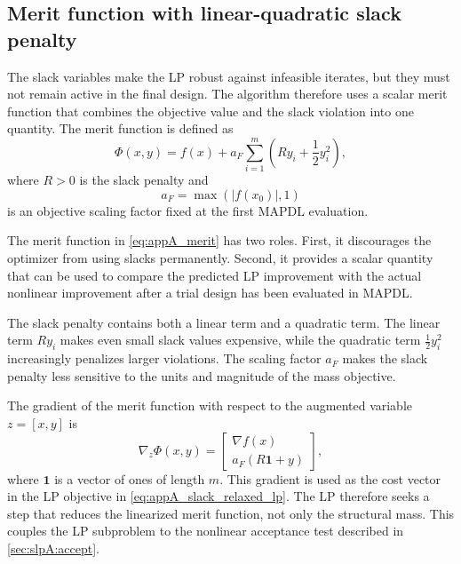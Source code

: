 \documentclass[11pt,a4paper]{article}
\begin{document}
\subsection{Merit function with linear-quadratic slack penalty}
\label{sec:slpA:merit}

The slack variables make the LP robust against infeasible iterates,
but they must not remain active in the final design. The algorithm
therefore uses a scalar merit function that combines the objective
value and the slack violation into one quantity. The merit function
is defined as
\begin{equation}
\label{eq:appA_merit}
    \Phi(x,y)
    =
    f(x)
    +
    a_F
    \sum_{i=1}^{m}
    \left(
        R y_i
        +
        \frac{1}{2}y_i^2
    \right),
\end{equation}
where $R > 0$ is the slack penalty and
\begin{equation}
\label{eq:appA_af}
    a_F = \max\left(|f(x_0)|,1\right)
\end{equation}
is an objective scaling factor fixed at the first MAPDL evaluation.

The merit function in \autoref{eq:appA_merit} has two roles. First,
it discourages the optimizer from using slacks permanently. Second,
it provides a scalar quantity that can be used to compare the
predicted LP improvement with the actual nonlinear improvement after
a trial design has been evaluated in MAPDL.

The slack penalty contains both a linear term and a quadratic term.
The linear term $R y_i$ makes even small slack values expensive,
while the quadratic term $\frac{1}{2}y_i^2$ increasingly penalizes
larger violations. The scaling factor $a_F$ makes the slack penalty
less sensitive to the units and magnitude of the mass objective.

The gradient of the merit function with respect to the augmented
variable $z=[x,y]$ is
\begin{equation}
\label{eq:appA_merit_grad}
    \nabla_z \Phi(x,y)
    =
    \begin{bmatrix}
        \nabla f(x)
        \\
        a_F(R\mathbf{1}+y)
    \end{bmatrix},
\end{equation}
where $\mathbf{1}$ is a vector of ones of length $m$. This gradient is
used as the cost vector in the LP objective in
\autoref{eq:appA_slack_relaxed_lp}. The LP therefore seeks a step that
reduces the linearized merit function, not only the structural mass.
This couples the LP subproblem to the nonlinear acceptance test
described in \autoref{sec:slpA:accept}.
\end{document}
